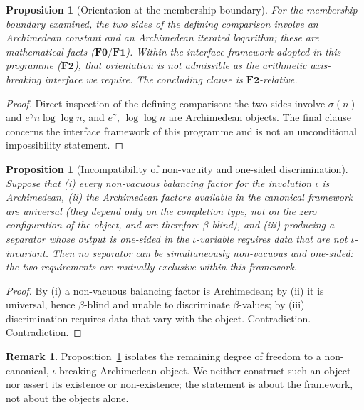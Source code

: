 \documentclass[11pt]{article}
\newtheorem{proposition}[theorem]{Proposition}
\theoremstyle{definition}
\newtheorem{remark}[theorem]{Remark}
\begin{document}
\begin{proposition}[Orientation at the membership boundary]\label{prop:robin}
For the membership boundary examined, the two sides of the defining comparison involve an Archimedean constant
and an Archimedean iterated logarithm; these are mathematical facts ($\mathbf{F0}/\mathbf{F1}$). Within the
interface framework adopted in this programme ($\mathbf{F2}$), that orientation is not admissible as the
arithmetic axis-breaking interface we require. The concluding clause is $\mathbf{F2}$-relative.
\end{proposition}
\begin{proof}
Direct inspection of the defining comparison: the two sides involve $\sigma(n)$ and $e^{\gamma}n\log\log n$,
and $e^{\gamma}$, $\log\log n$ are Archimedean objects. The final clause concerns the interface framework of this
programme and is not an unconditional impossibility statement.
\end{proof}

\begin{proposition}[Incompatibility of non-vacuity and one-sided discrimination]\label{prop:incompat}
Suppose that \textup{(i)} every non-vacuous balancing factor for the involution $\iota$ is Archimedean,
\textup{(ii)} the Archimedean factors available in the canonical framework are \emph{universal} (they depend only on the completion type, not on the zero configuration of the object, and are therefore $\beta$-blind), and
\textup{(iii)} producing a separator whose output is one-sided in the $\iota$-variable requires data that
are not $\iota$-invariant. Then no separator can be simultaneously non-vacuous and one-sided: the two
requirements are mutually exclusive within this framework.
\end{proposition}
\begin{proof}
By \textup{(i)} a non-vacuous balancing factor is Archimedean; by \textup{(ii)} it is universal, hence $\beta$-blind and unable to discriminate $\beta$-values; by \textup{(iii)} discrimination requires data that vary with the object. Contradiction. Contradiction.
\end{proof}

\begin{remark}
Proposition~\ref{prop:incompat} isolates the remaining degree of freedom to a non-canonical,
$\iota$-breaking Archimedean object. We neither construct such an object nor assert its existence or
non-existence; the statement is about the framework, not about the objects alone.
\end{remark}
\end{document}
